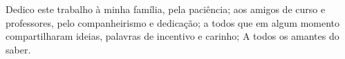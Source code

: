       Dedico este trabalho à minha família, 
      pela paciência;
      aos amigos de curso e professores, 
      pelo companheirismo e dedicação;
      a todos que em algum momento compartilharam 
      ideias, palavras de incentivo e carinho;
      A todos os amantes do saber.
